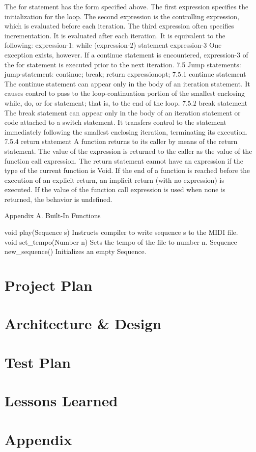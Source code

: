 \documentclass[12pt,A4]{book}
\begin{document}
The for statement has the form specified above.  The first expression specifies the initialization for the loop.  The second expression is the controlling expression, which is evaluated before each iteration.  The third expression often specifies incrementation.  It is evaluated after each iteration. It is equivalent to the following:
expression-1:    while (expression-2) {statement expression-3}
One exception exists, however.  If a continue statement is encountered, expression-3 of the for statement is executed prior to the next iteration.
7.5 Jump statements:
jump-statement:        continue;
                break;
                return expressionopt;
7.5.1 continue statement
The continue statement can appear only in the body of an iteration statement.  It causes control to pass to the loop-continuation portion of the smallest enclosing while, do, or for statement; that is, to the end of the loop.
7.5.2 break statement
The break statement can appear only in the body of an iteration statement or code attached to a switch statement. It transfers control to the statement immediately following the smallest enclosing iteration, terminating its execution.
7.5.4 return statement
A function returns to its caller by means of the return statement. The value of the expression is returned to the caller as the value of the function call expression. The return statement cannot have an expression if the type of the current function is Void.
If the end of a function is reached before the execution of an explicit return, an implicit return (with no expression) is executed. If the value of the function call expression is used when none is returned, the behavior is undefined.

Appendix A. Built-In Functions

void play(Sequence s)
    Instructs compiler to write sequence s to the MIDI file.
void set_tempo(Number n)
    Sets the tempo of the file to number n.
Sequence new_sequence()
    Initializes an empty Sequence.
\chapter{Project Plan}
\chapter{Architecture \& Design}
\chapter{Test Plan}
\chapter{Lessons Learned}
\chapter{Appendix}
\end{document}
